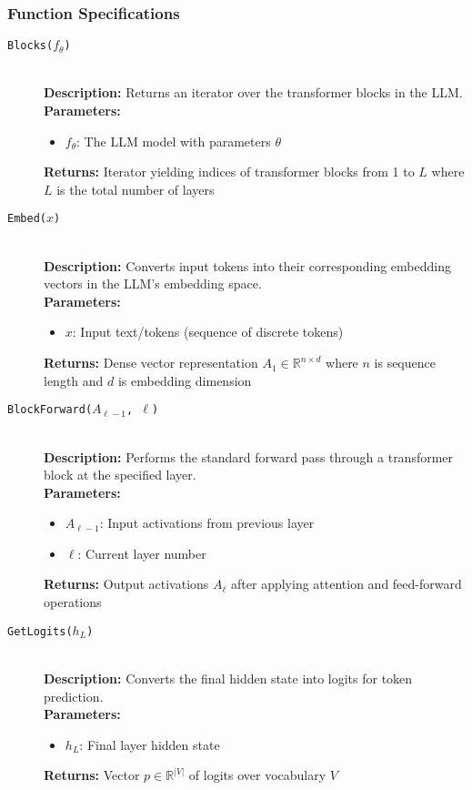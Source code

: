 \subsubsection{Function Specifications}
\begin{description}
\item[\texttt{Blocks($f_\theta$)}] \hfill \\
\textbf{Description:} Returns an iterator over the transformer blocks in the LLM. \\
\textbf{Parameters:}
\begin{itemize}
\item $f_\theta$: The LLM model with parameters $\theta$
\end{itemize}
\textbf{Returns:} Iterator yielding indices of transformer blocks from 1 to $L$ where $L$ is the total number of layers

\item[\texttt{Embed($x$)}] \hfill \\
\textbf{Description:} Converts input tokens into their corresponding embedding vectors in the LLM's embedding space. \\
\textbf{Parameters:}
\begin{itemize}
\item $x$: Input text/tokens (sequence of discrete tokens)
\end{itemize}
\textbf{Returns:} Dense vector representation $A_1 \in \mathbb{R}^{n \times d}$ where $n$ is sequence length and $d$ is embedding dimension
\item[\texttt{BlockForward($A_{\ell-1}$, $\ell$)}] \hfill \\
\textbf{Description:} Performs the standard forward pass through a transformer block at the specified layer. \\
\textbf{Parameters:}
\begin{itemize}
\item $A_{\ell-1}$: Input activations from previous layer
\item $\ell$: Current layer number
\end{itemize}
\textbf{Returns:} Output activations $A_\ell$ after applying attention and feed-forward operations
\item[\texttt{GetLogits($h_L$)}] \hfill \\
\textbf{Description:} Converts the final hidden state into logits for token prediction. \\
\textbf{Parameters:}
\begin{itemize}
\item $h_L$: Final layer hidden state
\end{itemize}
\textbf{Returns:} Vector $p \in \mathbb{R}^{|V|}$ of logits over vocabulary $V$
\end{description}

